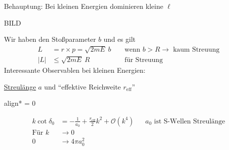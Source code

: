 	Behauptung: Bei kleinen Energien dominieren kleine $\ell$
	
	BILD
	
	Wir haben den Stoßparameter $b$ und es gilt
		\begin{align*}
			L &= r \times p = \sqrt{2mE} ~b & &\text{ wenn } b > R \rightarrow \text{ kaum Streuung} \\
			|L| &\leq \sqrt{2 m E} ~R & &\text{ für Streuung}
		\end{align*}
	Interessante Observablen bei kleinen Energien:
	
	\underline{Streulänge} $a$ und ``effektive Reichweite $r_{\text{eff}}$''
		\begin{empheq}[box=\boxed]{align*}
			\ell = 0
		\end{empheq}
		\begin{align*}
			k \cot \delta_0 &= 
			-\frac{1}{a_0} + \frac{r_{\text{eff}}}{2} k^2 + \mathscr{O}(k^4) 
			& &a_0 \text{ ist S-Wellen Streulänge} \\
			\text{Für } k &\rightarrow 0 \\
			0 &\rightarrow 4\pi a_0^2
		\end{align*}